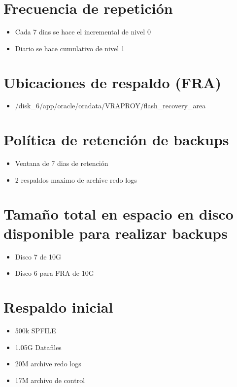 \documentclass[journal]{IEEEtran}
\begin{document}
\section{Frecuencia de repetición}
\begin{itemize}
  \item Cada 7 dias se hace el incremental de nivel 0
  \item Diario se hace cumulativo de nivel 1
\end{itemize}
\section{Ubicaciones de respaldo (FRA)}
\begin{itemize}
  \item /disk\_6/app/oracle/oradata/VRAPROY/flash\_recovery\_area
\end{itemize}
\section{Política de retención de backups}
\begin{itemize}
  \item Ventana de 7 dias de retención
  \item 2 respaldos maximo de archive redo logs
\end{itemize}
\section{Tamaño total en espacio en disco disponible para realizar backups}
\begin{itemize}
  \item Disco 7 de 10G
  \item Disco 6 para FRA de 10G
\end{itemize}
\section{Respaldo inicial}
\begin{itemize}
  \item 500k SPFILE
  \item 1.05G Datafiles
  \item 20M archive redo logs
  \item 17M archivo de control
\end{itemize}
\end{document}
